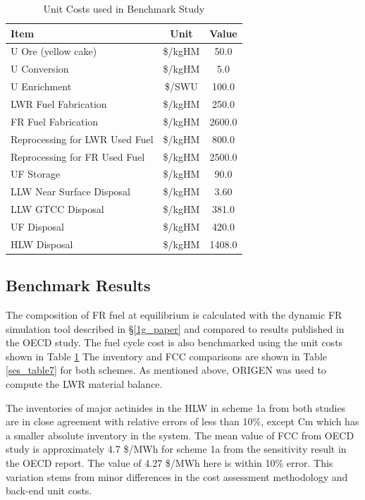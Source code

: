 \begin{table}[htbp]
\begin{center}
\caption{Unit Costs used in Benchmark Study}
\label{ses_table6}
\begin{tabular}{|l|c|c|}
\hline
\textbf{Item}                   & \textbf{Unit} & \textbf{Value} \\
\hline
U Ore (yellow cake)             & \$/kgHM       & 50.0 \\
U Conversion                    & \$/kgHM       & 5.0 \\
U Enrichment                    & \$/SWU        & 100.0 \\
LWR Fuel Fabrication            & \$/kgHM       & 250.0 \\
FR Fuel Fabrication             & \$/kgHM       & 2600.0 \\
Reprocessing for LWR Used Fuel  & \$/kgHM       & 800.0 \\
Reprocessing for FR Used Fuel   & \$/kgHM       & 2500.0 \\
UF Storage                      & \$/kgHM       & 90.0 \\
LLW Near Surface Disposal       & \$/kgHM       & 3.60 \\
LLW GTCC Disposal               & \$/kgHM       & 381.0 \\
UF Disposal                     & \$/kgHM       & 420.0 \\
HLW Disposal                    & \$/kgHM       & 1408.0 \\
\hline
\end{tabular}
\end{center}
\end{table}



\subsection{Benchmark Results}
\label{ses_sec:benchmark_results}
The composition of FR fuel at equilibrium is calculated with the
dynamic FR simulation tool described in \S \ref{1g_paper} and compared to
results published in the OECD study.  The fuel cycle cost is also
benchmarked using the unit costs shown in Table \ref{ses_table6} 
The inventory and FCC comparisons are shown in
Table \ref{ses_table7} for both schemes.  As mentioned above, ORIGEN was used to
compute the LWR material balance.

The inventories of major actinides in the HLW in scheme 1a from both
studies are in close agreement with relative errors of less than 10\%,
except Cm which has a smaller absolute inventory in the system. The mean
value of FCC from OECD study is approximately 4.7 \$/MWh for scheme 1a
from the sensitivity result in the OECD report. The value of 4.27 \$/MWh
here is within 10\% error.  This variation stems from
minor differences in the cost assessment methodology and back-end unit
costs. 


